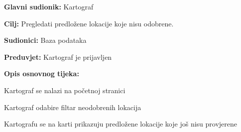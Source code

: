 					\noindent {}
					\begin{packed_item}
	
						\item \textbf{Glavni sudionik: }Kartograf
						\item  \textbf{Cilj:} Pregledati predložene lokacije koje nisu odobrene.
						\item  \textbf{Sudionici:} Baza podataka
						\item  \textbf{Preduvjet:} Kartograf je prijavljen
						\item  \textbf{Opis osnovnog tijeka:}
						
						\item[] \begin{packed_enum}
	
							\item Kartograf se nalazi na početnoj stranici
							\item Kartograf odabire filtar neodobrenih lokacija
							\item Kartografu se na karti prikazuju predložene lokacije koje još nisu provjerene

						\end{packed_enum}
						
					\end{packed_item}
					
